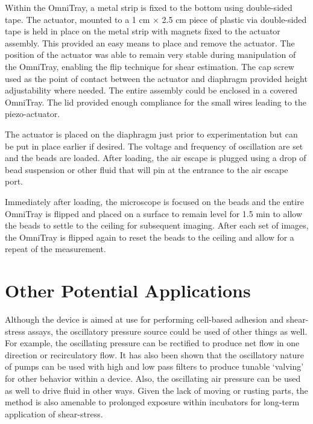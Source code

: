 Within the OmniTray, a metal strip is fixed to the bottom using double-sided tape. The actuator, mounted to a 1 cm $\times$ 2.5 cm piece of plastic via double-sided tape is held in place on the metal strip with magnets fixed to the actuator assembly. This provided an easy means to place and remove the actuator. The position of the actuator was able to remain very stable during manipulation of the OmniTray, enabling the flip technique for shear estimation. The cap screw used as the point of contact between the actuator and diaphragm provided height adjustability where needed. The entire assembly could be enclosed in a covered OmniTray. The lid provided enough compliance for the small wires leading to the piezo-actuator.

The actuator is placed on the diaphragm just prior to experimentation but can be put in place earlier if desired. The voltage and frequency of oscillation are set and the beads are loaded. After loading, the air escape is plugged using a drop of bead suspension or other fluid that will pin at the entrance to the air escape port.

Immediately after loading, the microscope is focused on the beads and the entire OmniTray is flipped and placed on a surface to remain level for 1.5 min to allow the beads to settle to the ceiling for subsequent imaging. After each set of images, the OmniTray is flipped again to reset the beads to the ceiling and allow for a repeat of the measurement. 

\section{Other Potential Applications}
Although the device is aimed at use for performing cell-based adhesion and shear-stress assays, the oscillatory pressure source could be used of other things as well. For example, the oscillating pressure can be rectified to produce net flow in one direction or recirculatory flow\cite{Leslie:2009vn,Seker:2009uq}. It has also been shown that the oscillatory nature of pumps can be used with high and low pass filters to produce tunable `valving' for other behavior within a device\cite{Mosadegh:2010kx}. Also, the oscillating air pressure can be used as well to drive fluid in other ways\cite{Langelier:2009qm}. Given the lack of moving or rusting parts, the method is also amenable to prolonged exposure within incubators for long-term application of shear-stress.

